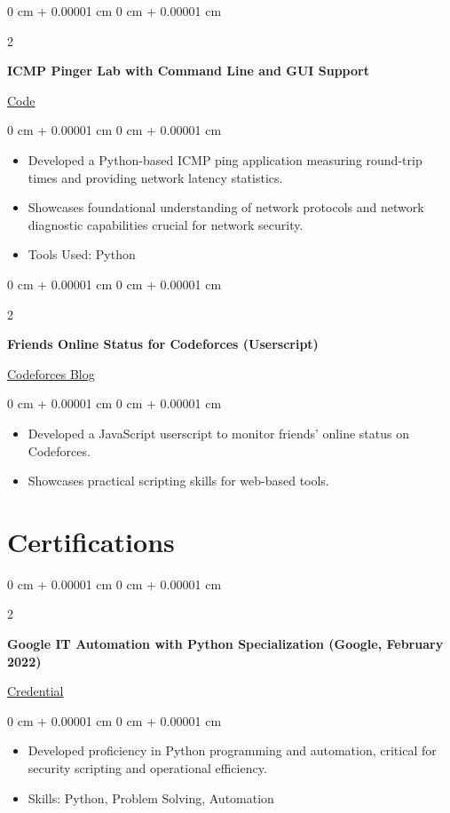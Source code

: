 \documentclass[10pt, letterpaper]{article}
\newenvironment{highlights}{
\begin{itemize}[
topsep=0.10 cm,
parsep=0.10 cm,
partopsep=0pt,
itemsep=0pt,
leftmargin=0 cm + 10pt
]
}{
\end{itemize}
} %
\newenvironment{onecolentry}{
\begin{adjustwidth}{
0 cm + 0.00001 cm
}{
0 cm + 0.00001 cm
}
}{
\end{adjustwidth}
} %
\newenvironment{twocolentry}[2][]{
\onecolentry
\def\secondColumn{#2}
\setcolumnwidth{\fill, 4.5 cm}
\begin{paracol}{2}
}{
\switchcolumn \raggedleft \secondColumn
\end{paracol}
\endonecolentry
} %
\begin{document}
\vspace{0.2 cm}

\begin{twocolentry}
	{\href{https://github.com/ItsTHEAvro/ICMP_Pinger_Lab}{Code}}
	\textbf{ICMP Pinger Lab with Command Line and GUI Support}
\end{twocolentry}

\vspace{0.10 cm}
\begin{onecolentry}
	\begin{highlights}
		\item Developed a Python-based ICMP ping application measuring round-trip times and providing network latency statistics.
		\item Showcases foundational understanding of network protocols and network diagnostic capabilities crucial for network security.
		\item Tools Used: Python
	\end{highlights}
\end{onecolentry}

\vspace{0.2 cm}

\begin{twocolentry}
	{
		\href{https://codeforces.com/blog/entry/110724}{Codeforces Blog}
	}
	\textbf{Friends Online Status for Codeforces (Userscript)}
\end{twocolentry}

\vspace{0.10 cm}
\begin{onecolentry}
	\begin{highlights}
		\item Developed a JavaScript userscript to monitor friends' online status on Codeforces.
		\item Showcases practical scripting skills for web-based tools.
	\end{highlights}
\end{onecolentry}

\section{Certifications}
\begin{twocolentry}
	{\href{https://www.coursera.org/account/accomplishments/specialization/W6VVV4LRX95X}{Credential}}
	\textbf{Google IT Automation with Python Specialization (Google, February 2022)}
\end{twocolentry}
\vspace{0.10 cm}
\begin{onecolentry}
	\begin{highlights}
		\item Developed proficiency in Python programming and automation, critical for security scripting and operational efficiency.
		\item Skills: Python, Problem Solving, Automation
	\end{highlights}
\end{onecolentry}
\vspace{0.2 cm}
\end{document}
